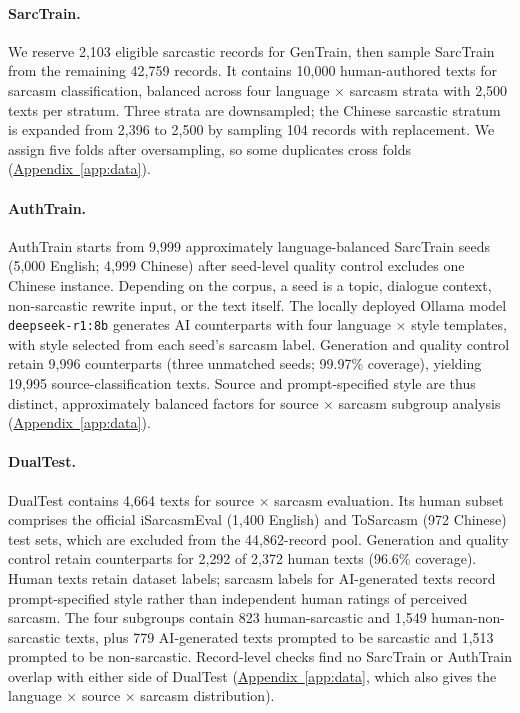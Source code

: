 \documentclass[11pt]{article}
\newcommand{\Appref}[1]{\hyperref[#1]{Appendix~\ref*{#1}}}
\begin{document}
\paragraph{SarcTrain.} We reserve 2{,}103 eligible sarcastic records for GenTrain, then sample SarcTrain from the remaining 42{,}759 records. It contains 10{,}000 human-authored texts for sarcasm classification, balanced across four language $\times$ sarcasm strata with 2{,}500 texts per stratum. Three strata are downsampled; the Chinese sarcastic stratum is expanded from 2{,}396 to 2{,}500 by sampling 104 records with replacement. We assign five folds after oversampling, so some duplicates cross folds (\Appref{app:data}).

\paragraph{AuthTrain.} AuthTrain starts from 9{,}999 approximately language-balanced SarcTrain seeds (5{,}000 English; 4{,}999 Chinese) after seed-level quality control excludes one Chinese instance. Depending on the corpus, a seed is a topic, dialogue context, non-sarcastic rewrite input, or the text itself. The locally deployed Ollama model \texttt{deepseek-r1:8b} \citep{deepseek2025r1,ollama2025deepseek8b} generates AI counterparts with four language $\times$ style templates, with style selected from each seed's sarcasm label. Generation and quality control retain 9{,}996 counterparts (three unmatched seeds; 99.97\% coverage), yielding 19{,}995 source-classification texts. Source and prompt-specified style are thus distinct, approximately balanced factors for source $\times$ sarcasm subgroup analysis (\Appref{app:data}).

\paragraph{DualTest.} DualTest contains 4{,}664 texts for source $\times$ sarcasm evaluation. Its human subset comprises the official iSarcasmEval (1{,}400 English) and ToSarcasm (972 Chinese) test sets, which are excluded from the 44{,}862-record pool. Generation and quality control retain counterparts for 2{,}292 of 2{,}372 human texts (96.6\% coverage). Human texts retain dataset labels; sarcasm labels for AI-generated texts record prompt-specified style rather than independent human ratings of perceived sarcasm. The four subgroups contain 823 human-sarcastic and 1{,}549 human-non-sarcastic texts, plus 779 AI-generated texts prompted to be sarcastic and 1{,}513 prompted to be non-sarcastic. Record-level checks find no SarcTrain or AuthTrain overlap with either side of DualTest (\Appref{app:data}, which also gives the language $\times$ source $\times$ sarcasm distribution).
\end{document}
